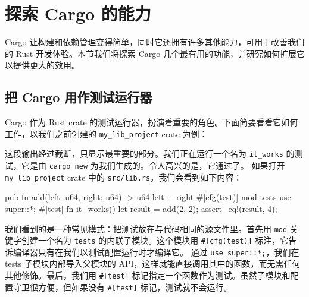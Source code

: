 \section{探索 Cargo 的能力}
\label{idx:idx_ce992405}
Cargo 让构建和依赖管理变得简单，同时它还拥有许多其他能力，可用于改善我们的 Rust 开发体验。本节我们将探索 Cargo 几个最有用的功能，并研究如何扩展它以提供更大的效用。
\subsection{把 Cargo 用作测试运行器}
\label{idx:idx_ce7a80bd}
Cargo 作为 Rust crate 的测试运行器，扮演着重要的角色。下面简要看看它如何工作，以我们之前创建的 \texttt{my\_\allowbreak{}lib\_\allowbreak{}project} crate 为例：
这段输出经过截断，只显示最重要的部分。我们正在运行一个名为
\texttt{it\_works} 的测试，它是由 \texttt{cargo new} 为我们生成的。令人高兴的是，它通过了。
如果打开 \texttt{my\_\allowbreak{}lib\_\allowbreak{}project} crate 中的 \texttt{src/lib.rs}，我们会看到如下内容：
\begin{codebox}[rust]
pub fn add(left: u64, right: u64) -> u64 {
    left + right
}
#[cfg(test)]
mod tests {
    use super::*;
    #[test]
    fn it_works() {
        let result = add(2, 2);
        assert_eq!(result, 4);
    }
}
\end{codebox}
\label{idx:idx_64045762}
我们看到的是一种常见模式：把测试放在与代码相同的源文件里。首先用 \texttt{mod} 关键字创建一个名为 \texttt{tests} 的内联子模块。这个模块用 \texttt{\#[\allowbreak{}cfg(\allowbreak{}test)\allowbreak{}]\allowbreak{}} 标注，它告诉编译器只有在我们以测试配置运行时才编译它。
通过 \texttt{use super::\allowbreak{}*;\allowbreak{}}，我们在 tests 子模块内部导入父模块的 API，这样就能直接调用其中的函数，而无需任何其他修饰。最后，我们用 \texttt{\#[test]} 标记指定一个函数作为测试。虽然子模块和配置守卫很方便，但如果没有 \texttt{\#[test]} 标记，测试就不会运行。
